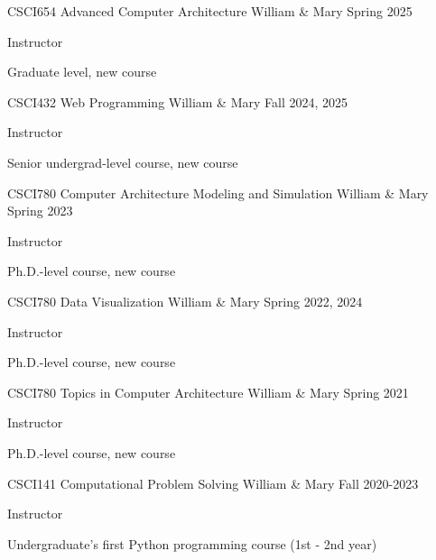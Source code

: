 
\vspace{-0.3cm}

\begin{cventries}
    \cvteaching
      {CSCI654}
      {Advanced Computer Architecture}
      {William \& Mary}
      {Spring 2025}
      {
            \item Instructor
            \item Graduate level, new course
      }
      
    \cvteaching
      {CSCI432}
      {Web Programming}
      {William \& Mary}
      {Fall 2024, 2025}
      {
            \item Instructor
            \item Senior undergrad-level course, new course
      }

    \cvteaching
      {CSCI780}
      {Computer Architecture Modeling and Simulation}
      {William \& Mary}
      {Spring 2023}
      {
            \item Instructor
            \item Ph.D.-level course, new course
      }

    \cvteaching
      {CSCI780}
      {Data Visualization}
      {William \& Mary}
      {Spring 2022, 2024}
      {
            \item Instructor
            \item Ph.D.-level course, new course
      }
      
    \cvteaching
      {CSCI780}
      {Topics in Computer Architecture}
      {William \& Mary}
      {Spring 2021}
      {
            \item Instructor
            \item Ph.D.-level course, new course
      }

    \cvteaching
      {CSCI141}
      {Computational Problem Solving}
      {William \& Mary}
      {Fall 2020-2023}
      {
        \item Instructor
        \item Undergraduate's first Python programming course (1st - 2nd year)
      }
\end{cventries}

